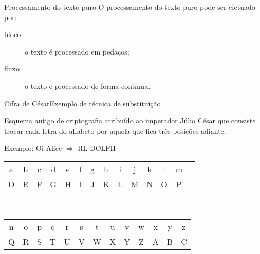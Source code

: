 \begin{frame}{Processamento do texto puro}
  O processamento do texto puro pode ser efetuado por:
  
  \begin{description}
  \item[bloco] o texto é processado em pedaços;
  \item[fluxo] o texto é processado de forma contínua.
  \end{description}

\end{frame}

\begin{frame}{Cifra de César}{Exemplo de técnica de substituição}

 Esquema antigo de criptografia atribuído ao imperador Júlio César que
consiste trocar cada letra do alfabeto por aquela que fica três
posições adiante.\bigskip

Exemplo: Oi Alice $\Rightarrow$ RL DOLFH\bigskip

\begingroup
\begin{center}
\scriptsize
\begin{tabular}{cccccccccccccc}
a& b& c &d &e &f& g &h& i& j &k & l & m\\
D& E &F& G& H &I &J& K &L &M& N & O & P\\
\end{tabular}\\\bigskip
\begin{tabular}{ccccccccccccc}
 n &o& p &q& r &s& t &u& v &w& x& y &z\\
 Q& R &S& T &U& V &W &X& Y &Z& A &B& C\\
\end{tabular}
\end{center}
\endgroup

\end{frame}

